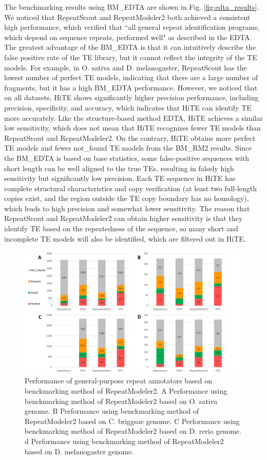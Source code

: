 \documentclass{bmcart}
\begin{document}
The benchmarking results using BM\_EDTA are shown in Fig. \ref{fig:edta_results}. We noticed that RepeatScout and RepeatModeler2 both achieved a consistent high performance, which verified that ``all general repeat identification programs, which depend on sequence repeats, performed well" as described in the EDTA\cite{ou2019benchmarking}. The greatest advantage of the BM\_EDTA is that it can intuitively describe the false positive rate of the TE library, but it cannot reflect the integrity of the TE models. For example, in O. sativa and D. melanogaster, RepeatScout has the lowest number of perfect TE models, indicating that there are a large number of fragments, but it has a high BM\_EDTA performance. However, we noticed that on all datasets, HiTE shows significantly higher precision performance, including precision, specificity, and accuracy, which indicates that HiTE can identify TE more accurately. Like the structure-based method EDTA, HiTE achieves a similar low sensitivity, which does not mean that HiTE recognizes fewer TE models than RepeatScout and RepeatModeler2. On the contrary, HiTE obtains more perfect TE models and fewer not\_found TE models from the BM\_RM2 results. 
Since the BM\_EDTA is based on base statistics, some false-positive sequences with short length can be well aligned to the true TEs, resulting in falsely high sensitivity but significantly low precision. Each TE sequence in HiTE has complete structural characteristics and copy verification (at least two full-length copies exist, and the region outside the TE copy boundary has no homology), which leads to high precision and somewhat lower sensitivity.
The reason that RepeatScout and RepeatModeler2 can obtain higher sensitivity is that they identify TE based on the repeatedness of the sequence, so many short and incomplete TE models will also be identified, which are filtered out in HiTE.

\begin{figure}[h!]
	\centerline{\includegraphics[width=1.0\textwidth]{figures/RM2Results.pdf}}
	\caption{Performance of general-purpose repeat annotators based on benckmarking method of RepeatModeler2. A Performance using benckmarking method of RepeatModeler2 based on O. sativa genome. B Performance using benckmarking method of RepeatModeler2 based on C. briggsae genome. C Performance using benckmarking method of RepeatModeler2 based on D. rerio genome. d Performance using benckmarking method of RepeatModeler2 based on D. melanogaster genome.}
	\label{fig:rm2_results}
\end{figure}
\end{document}
